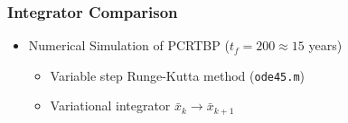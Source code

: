 \begin{frame}[t] %
\frametitle{Integrator Comparison}
	\begin{itemize}
		\item Numerical Simulation of PCRTBP (\( t_f = 200 \approx 15 \) years)
			\begin{itemize}
				\item Variable step Runge-Kutta method (\texttt{ode45.m})
				\item Variational integrator \( \bar{x}_k \to \bar{x}_{k+1} \)
			\end{itemize} 
	\end{itemize}
	\begin{figure} 
	\centering 
	\begin{subfigure}[t]{0.4\textwidth} 
	\end{subfigure}~ %
	\begin{subfigure}[t]{0.4\textwidth} 
	\end{subfigure} 
	\end{figure}
	
	\begin{itemize}
	\end{itemize}
\end{frame} %